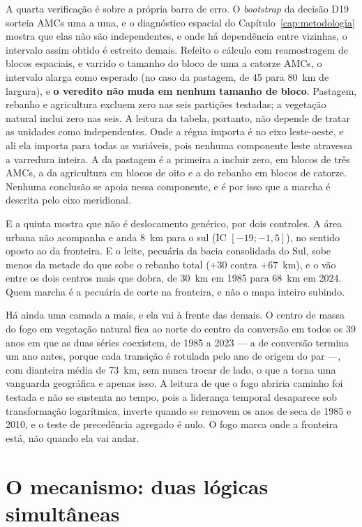 A quarta verificação é sobre a própria barra de erro. O \emph{bootstrap} da
decisão D19 sorteia AMCs uma a uma, e o diagnóstico espacial do
Capítulo~\ref{cap:metodologia} mostra que elas não são independentes, e onde há
dependência entre vizinhas, o intervalo assim obtido é estreito demais.
Refeito o cálculo com reamostragem de blocos espaciais, e varrido o tamanho do
bloco de uma a catorze AMCs, o intervalo alarga como esperado (no caso da
pastagem, de 45 para 80~km de largura), e \textbf{o veredito não muda em
nenhum tamanho de bloco}. Pastagem, rebanho e agricultura excluem zero nas seis
partições testadas; a vegetação natural inclui zero nas seis. A leitura da
tabela, portanto, não depende de tratar as unidades como independentes. Onde a
régua importa é no eixo leste-oeste, e ali ela importa para todas as variáveis,
pois nenhuma componente leste atravessa a varredura inteira. A da pastagem é a
primeira a incluir zero, em blocos de três AMCs, a da agricultura em blocos de
oito e a do rebanho em blocos de catorze. Nenhuma conclusão se apoia nessa
componente, e é por isso que a marcha é descrita pelo eixo meridional.

E a quinta mostra que não é deslocamento genérico, por dois controles. A área urbana
não acompanha e anda 8~km para o sul (IC $[-19; -1{,}5]$), no sentido oposto
ao da fronteira. E o leite, pecuária da bacia consolidada do Sul, sobe menos
da metade do que sobe o rebanho total ($+30$ contra $+67$~km), e o vão entre
os dois centros mais que dobra, de 30~km em 1985 para 68~km em 2024. Quem
marcha é a pecuária de corte na fronteira, e não o mapa inteiro subindo.

Há ainda uma camada a mais, e ela vai à frente das demais. O centro de massa
do fogo em vegetação natural fica ao norte do centro da conversão em todos os
39 anos em que as duas séries coexistem, de 1985 a 2023 --- a de conversão
termina um ano antes, porque cada transição é rotulada pelo ano de origem do
par ---, com dianteira média de 73~km, sem nunca trocar de lado, o que a torna uma
vanguarda geográfica e apenas isso. A leitura de que o fogo abriria caminho
foi testada e não se sustenta no tempo, pois a liderança temporal desaparece sob
transformação logarítmica, inverte quando se removem os anos de seca de 1985 e
2010, e o teste de precedência agregado é nulo. O fogo marca onde a fronteira
está, não quando ela vai andar.

\section{O mecanismo: duas lógicas simultâneas}
\label{sec:res-perna2}

